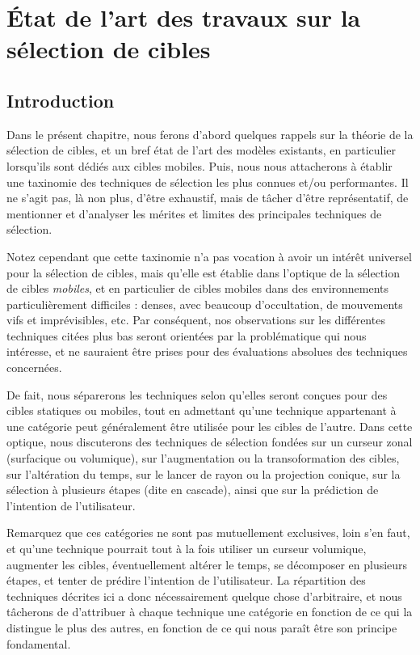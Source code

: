 
\chapter[Sélection de cibles : état de l'art]{État de l'art des travaux sur la sélection de cibles}
\minitoc
\label{chap2}
\cleardoublepage

\section{Introduction}
	Dans le présent chapitre, nous ferons d'abord quelques rappels sur la théorie de la sélection de cibles, et un bref état de l'art des modèles existants, en particulier lorsqu'ils sont dédiés aux cibles mobiles. Puis, nous nous attacherons à établir une taxinomie des techniques de sélection les plus connues et/ou performantes. Il ne s'agit pas, là non plus, d'être exhaustif, mais de tâcher d'être représentatif, de mentionner et d'analyser les mérites et limites des principales techniques de sélection.
	
	Notez cependant que cette taxinomie n'a pas vocation à avoir un intérêt universel pour la sélection de cibles, mais qu'elle est établie dans l'optique de la sélection de cibles \emph{mobiles}, et en particulier de cibles mobiles dans des environnements particulièrement difficiles : denses, avec beaucoup d'occultation, de mouvements vifs et imprévisibles, etc. Par conséquent, nos observations sur les différentes techniques citées plus bas seront orientées par la problématique qui nous intéresse, et ne sauraient être prises pour des évaluations absolues des techniques concernées.
	
	De fait, nous séparerons les techniques selon qu'elles seront conçues pour des cibles statiques ou mobiles, tout en admettant qu'une technique appartenant à une catégorie peut généralement être utilisée pour les cibles de l'autre. Dans cette optique, nous discuterons des techniques de sélection fondées sur un curseur zonal (surfacique ou volumique), sur l'augmentation ou la transoformation des cibles, sur l'altération du temps, sur le lancer de rayon ou la projection conique, sur la sélection à plusieurs étapes (dite en cascade), ainsi que sur la prédiction de l'intention de l'utilisateur.
	
	Remarquez que ces catégories ne sont pas mutuellement exclusives, loin s'en faut, et qu'une technique pourrait tout à la fois utiliser un curseur volumique, augmenter les cibles, éventuellement altérer le temps, se décomposer en plusieurs étapes, et tenter de prédire l'intention de l'utilisateur. La répartition des techniques décrites ici a donc nécessairement quelque chose d'arbitraire, et nous tâcherons de d'attribuer à chaque technique une catégorie en fonction de ce qui la distingue le plus des autres, en fonction de ce qui nous paraît être son principe fondamental.
	
